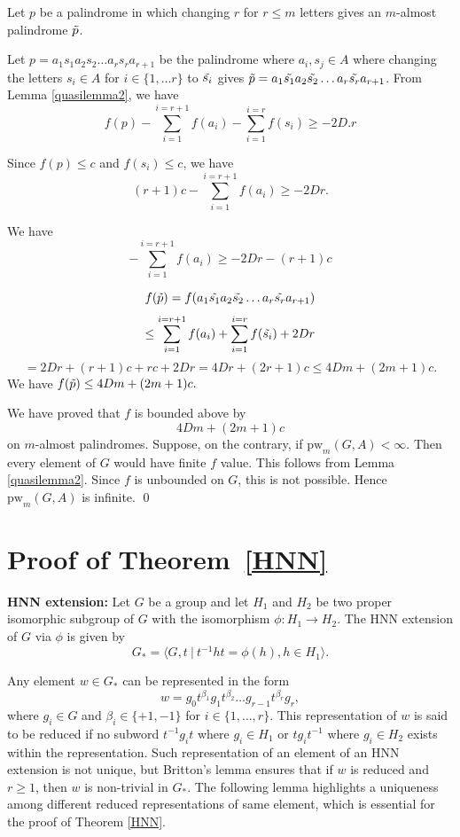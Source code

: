 \documentclass[12pt]{amsart}
\theoremstyle{definition}
\theoremstyle{remark}
\numberwithin{equation}{subsection}
\theoremstyle{plain}
\numberwithin{equation}{section}
\begin{document}
    Let $p$ be a palindrome in which changing $r$ for $r \leq m$ letters gives an $m$-almost palindrome $\Tilde{p}$.
    
    Let $p = a_1s_1a_2s_2 \ldots a_rs_ra_{r+1}$ be the palindrome where $a_i, s_j \in A $ where changing the letters $s_i \in A$ for $i \in \{1, \ldots r \}$ to $\Tilde{s_i}$ gives $\Tilde{p} = a_1\Tilde{s_1}a_2\Tilde{s_2} \ldots a_r\Tilde{s_r}a_{r+1}$.
    From Lemma \ref{quasilemma2}, we have 
    $$f(p) - \sum_{i=1}^{i=r+1} f(a_i) -  \sum_{i=1}^{i=r}f(s_i) \geq -2D.r$$

    Since $f(p) \leq c$ and $f(s_i) \leq c$, we have $$ (r +1)c - \sum_{i=1}^{i=r+1} f(a_i) \geq -2Dr.$$

    We have
    \begin{equation}
        - \sum_{i=1}^{i=r+1} f(a_i) \geq -2Dr - (r+1)c
    \end{equation}

    $$f(\Tilde{p}) = f(a_1\Tilde{s_1}a_2\Tilde{s_2} \ldots a_r\Tilde{s_r}a_{r+1})$$
    $$\leq \sum_{i=1}^{i=r+1} f(a_i) + \sum_{i=1}^{i=r}f(\Tilde{s_i}) + 2Dr$$
    $$= 2Dr+(r+1)c+rc+2Dr = 4Dr+ (2r+1)c \leq 4Dm+ (2m+1)c.$$
    We have $f(\Tilde{p}) \leq 4Dm+ (2m+1)c.$ 

    We have proved that $f$ is bounded above by $$4Dm+ (2m+1)c$$
    on $m$-almost palindromes.  Suppose, on the contrary, if $\mathrm{pw}_m(G,A) < \infty$. Then every element of $G$ would have finite $f$ value. This follows from Lemma \ref{quasilemma2}. Since $f$ is unbounded on $G$, this is not possible. Hence $\mathrm{pw}_m(G,A)$ is infinite.    
\qed


\section{Proof of Theorem~\ref{HNN}} 
\textbf{HNN extension:} Let $G$ be a group and let $H_1$ and $H_2$ be two proper isomorphic subgroup of $G$ with the isomorphism $\phi: H_1 \longrightarrow H_2$. The $\mathrm{HNN}$ extension of $G$ via $\phi$ is given by
    $$G_* = \langle G, t ~\vert~ t^{-1}ht = \phi(h), h \in H_1 \rangle .$$

Any element $w \in G_*$ can be represented in the form $$w = g_0t^{\beta_1}g_1t^{\beta_2}\ldots g_{r-1}t^{\beta_{r}}g_r,$$ 
where $g_i \in G$ and $\beta_i \in \{+1,-1\}$ for $i \in \{1, \ldots , r \}$. This representation of $w$ is said to be reduced if no subword $t^{-1}g_it$ where $g_i \in H_1$ or $tg_it^{-1}$ where $g_i \in H_2$ exists within the representation.  Such representation of an element of an HNN extension is not unique, but Britton's lemma ensures that if $w$ is reduced and $r \geq 1$, then $w$ is non-trivial in $G_*$. The following lemma highlights a uniqueness among different reduced representations of same element,  which is essential for the proof of Theorem \ref{HNN}.
\end{document}
